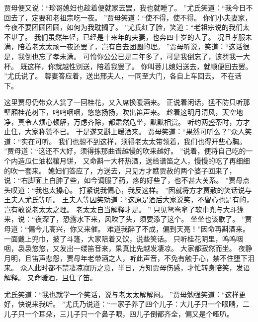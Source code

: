 贾母便又说：“珍哥媳妇也趁着便就家去罢，我也就睡了。
”尤氏笑道：“我今日不回去了，定要和老祖宗吃一夜。
”贾母笑道：“使不得，使不得。
你们小夫妻家，今夜不要团圆团圆，如何为我耽搁了。
”尤氏红了脸，笑道：“老祖宗说的我们太不堪了。
我们虽然年轻，已经是十来年的夫妻，也奔四十岁的人了。
况且孝服未满，陪着老太太顽一夜还罢了，岂有自去团圆的理。
”贾母听说，笑道：“这话很是，我倒也忘了孝未满。
可怜你公公已是二年多了，可是我倒忘了，该罚我一大杯。
既这样，你就越性别送，陪着我罢了。
你叫蓉儿媳妇送去，就顺便回去罢。
”尤氏说了。
蓉妻答应着，送出邢夫人，一同至大门，各自上车回去。
不在话下。
\par
这里贾母仍带众人赏了一回桂花，又入席换暖酒来。
正说着闲话，猛不防只听那壁厢桂花树下，呜呜咽咽，悠悠扬扬，吹出笛声来。
趁着这明月清风，天空地净，真令人烦心顿解，万虑齐除，都肃然危坐，默默相赏。
听约两盏茶时，方才止住，大家称赞不已。
于是遂又斟上暖酒来。
贾母笑道：“果然可听么？”众人笑道：“实在可听。
我们也想不到这样，须得老太太带领着，我们也得开些心胸。
”贾母道：“这还不大好，须得拣那曲谱越慢的吹来越好。
”说着，便将自己吃的一个内造瓜仁油松穰月饼，
又命斟一大杯热酒，送给谱笛之人，慢慢的吃了再细细的吹一套来。
媳妇们答应了，方送去，只见方才瞧贾赦的两个婆子回来了，说：“右脚面上白肿了些，如今调服了药，疼的好些了，也不甚大关系。
”贾母点头叹道：“我也太操心。
打紧说我偏心，我反这样。
”因就将方才贾赦的笑话说与王夫人尤氏等听。
王夫人等因笑劝道：“这原是酒后大家说笑，不留心也是有的，岂有敢说老太太之理。
老太太自当解释才是。
”
只见鸳鸯拿了软巾兜与大斗篷来，说：“夜深了，恐露水下来，风吹了头，须要添了这个。
坐坐也该歇了。
”贾母道：“偏今儿高兴，你又来催。
难道我醉了不成，偏到天亮！”因命再斟酒来。
一面戴上兜巾，披了斗篷，大家陪着又饮，说些笑话。
只听桂花阴里，呜呜咽咽，袅袅悠悠，又发出一缕笛音来，果真比先越发凄凉。
大家都寂然而坐。
夜静月明，且笛声悲怨，贾母年老带酒之人，听此声音，不免有触于心，禁不住堕下泪来。
众人此时都不禁凄凉寂历之意，半日，方知贾母伤感，才忙转身陪笑，发语解释。
又命暖酒，且住了笛。
\par
尤氏笑道：“我也就学一个笑话，说与老太太解解闷。
”贾母勉强笑道：“这样更好，快说来我听。
”尤氏乃说道：“一家子养了四个儿子：大儿子只一个眼睛，二儿子只一个耳朵，三儿子只一个鼻子眼，四儿子倒都齐全，偏又是个哑叭。
